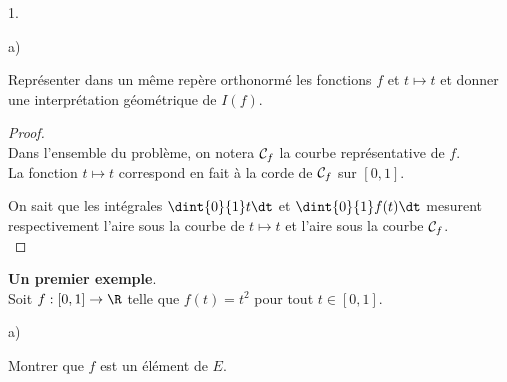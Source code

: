\begin{noliste}{1.}
\begin{noliste}{a)}
  
  \item Représenter dans un même repère orthonormé les fonctions $f$ et 
  $t \mapsto t $ et donner une interprétation géométrique de $I(f)$.
  
  \begin{proof}~\\
    Dans l'ensemble du problème, on notera ${\cal C}_f$ la courbe
    représentative de $f$.\\
    La fonction $t\mapsto t$ correspond en fait à la corde de 
    ${\cal C}_f$ sur $[0,1]$. 
    
    \begin{center}
    \shorthandoff{;} 
    \end{center}

  On sait que les intégrales $\dint{0}{1} t\dt$ et $\dint{0}{1} 
  f(t)\dt$ mesurent respectivement l'aire sous la courbe de $t \mapsto 
  t$ et l'aire sous la courbe ${\cal C}_f$. 
  ~\\[-1cm]
  \end{proof}
 \end{noliste}
 
 
 
 \newpage
 
 
 
 \item \textbf{Un premier exemple}.\\
 Soit $f : [0,1] \to \R$ telle que $f(t)= t^2$ pour tout $t \in [0,1]$. 
 \begin{noliste}{a)}
  \setlength{\itemsep}{2mm}
  \item Montrer que $f$ est un élément de $E$.
  

\end{noliste}
\end{noliste}
